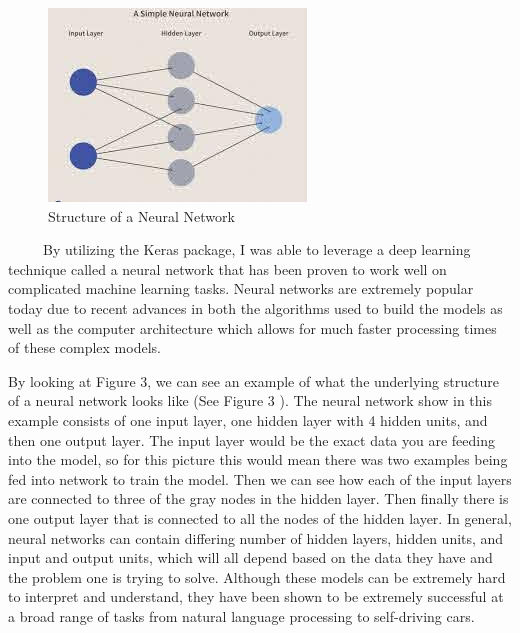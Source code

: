 \documentclass[12pt]{article}
\begin{document}
\begin{figure}

{\centering \includegraphics[width=0.75\linewidth,height=0.25\textheight]{images/neural_net} 

}

\caption{Structure of a Neural Network}\label{fig:sample-fig3}
\end{figure}

~~~~~By utilizing the Keras package, I was able to leverage a deep
learning technique called a neural network that has been proven to work
well on complicated machine learning tasks. Neural networks are
extremely popular today due to recent advances in both the algorithms
used to build the models as well as the computer architecture which
allows for much faster processing times of these complex models.

By looking at Figure 3, we can see an example of what the underlying
structure of a neural network looks like (See Figure 3
\citep{Investopedia}). The neural network show in this example consists
of one input layer, one hidden layer with 4 hidden units, and then one
output layer. The input layer would be the exact data you are feeding
into the model, so for this picture this would mean there was two
examples being fed into network to train the model. Then we can see how
each of the input layers are connected to three of the gray nodes in the
hidden layer. Then finally there is one output layer that is connected
to all the nodes of the hidden layer. In general, neural networks can
contain differing number of hidden layers, hidden units, and input and
output units, which will all depend based on the data they have and the
problem one is trying to solve. Although these models can be extremely
hard to interpret and understand, they have been shown to be extremely
successful at a broad range of tasks from natural language processing to
self-driving cars.
\end{document}
